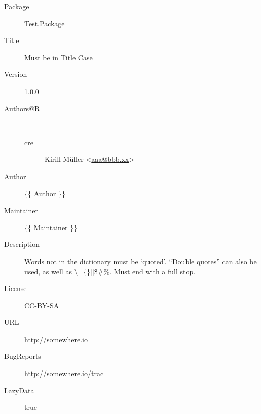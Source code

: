 \begin{description}
  \raggedright{}
  \item[Package] Test.Package
  \item[Title] Must be in Title Case
  \item[Version] 1.0.0
  \item[Authors@R] \\
    \begin{description}
      \item[cre] Kirill Müller <\href{mailto:aaa@bbb.xx}{aaa@bbb.xx}>
    \end{description}
  \item[Author] \{\{ Author \}\}
  \item[Maintainer] \{\{ Maintainer \}\}
  \item[Description] Words not in the dictionary must be `quoted'. ``Double quotes'' can also be used, as well as \textbackslash \_\{\}[]\^\$\#\%. Must end with a full stop.
  \item[License] CC-BY-SA
  \item[URL] \url{http://somewhere.io}
  \item[BugReports] \url{http://somewhere.io/trac}
  \item[LazyData] true
\end{description}
